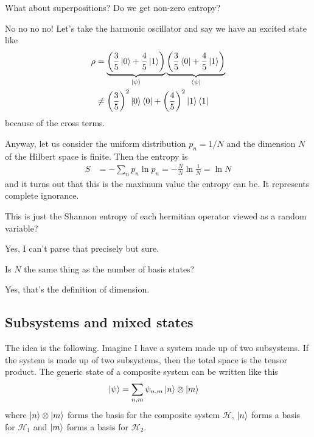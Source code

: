 \begin{question}
    What about superpositions?
    Do we get non-zero entropy?
\end{question}
No no no no!
Let's take the harmonic oscillator
and say we have an excited state like
\begin{align}
    \rho &=
    \underbrace{\left( \frac{3}{5}\ket{0} + \frac{4}{5}\ket{1} \right)}_{%
        \ket{\psi}
    }
    \underbrace{\left( \frac{3}{5}\bra{0} + \frac{4}{5}\ket{1} \right)}_{%
        \bra{\psi}
    }\\
    &\ne \left( \frac{3}{5} \right)^2 \ket{0}\bra{0}
    + \left( \frac{4}{5} \right)^2 \ket{1}\bra{1}
\end{align}
because of the cross terms.

Anyway,
let us consider the uniform distribution
$p_n=1/N$
and the dimension $N$ of the Hilbert space is finite.
Then the entropy is
\begin{align}
    S &= -\sum_n p_n\ln p_n
    = -\frac{N}{N}\ln \frac{1}{N} = \ln N
\end{align}
and it turns out that this is the maximum value the entropy can be.
It represents complete ignorance.

\begin{question}
    This is just the Shannon entropy of each hermitian operator viewed as a
    random variable?
\end{question}
Yes, I can't parse that precisely but sure.

\begin{question}
    Is $N$ the same thing as the number of basis states?
\end{question}
Yes, that's the definition of dimension.

\subsection{Subsystems and mixed states}
The idea is the following.
Imagine I have a system made up of two subsystems.
If the system is made up of two subsystems,
then the total space is the tensor product.
The generic state of a composite system can be written like this
\begin{align}
    \ket{\psi} &=
    \sum_{n,m} \psi_{n,m}
    \ket{n}\otimes\ket{m}
\end{align}
where $\ket{n}\otimes\ket{m}$ forms the basis for the composite system
$\mathcal{H}$,
$\ket{n}$ forms a basis for $\mathcal{H}_1$ and
$\ket{m}$ forms a basis for $\mathcal{H}_2$.

